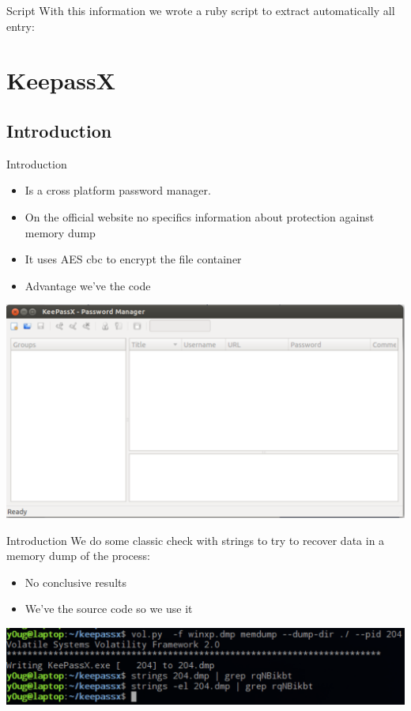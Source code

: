 \documentclass[compress]{beamer}
\begin{document}
\begin{frame}{Script}
With this information we wrote a ruby script to extract automatically all entry:
\end{frame}

\section{KeepassX}
\subsection{Introduction}
\begin{frame}{Introduction}
  \begin{itemize}
    \item Is a cross platform password manager.
    \item On the official website no specifics information about protection against memory dump
    \item It uses AES cbc to encrypt the file container
    \item Advantage we've the code
  \end{itemize}
  \begin{center}
    \includegraphics[scale=0.2]{img/keypass.eps}
  \end{center}
\end{frame}

\begin{frame}{Introduction}
  We do some classic check with strings to try to recover data in a memory dump of the process:
  \begin{itemize}
    \item No conclusive results
    \item We've the source code so we use it
  \end{itemize}
  \vspace{0.1in}
  \includegraphics[scale=0.4]{img/keypass_strings_test.eps}
\end{frame}
\end{document}
